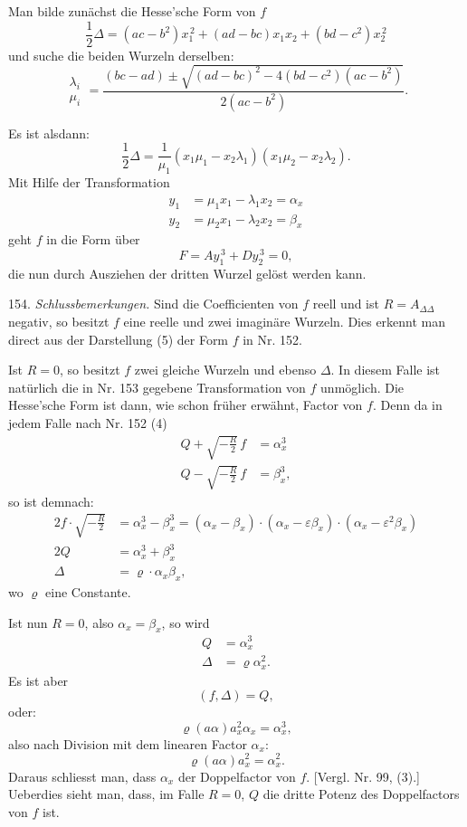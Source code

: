 \documentclass[11pt]{article}
\providecommand{\weberpage}[1]{}
\let\Delta\varDelta
\begin{document}
Man bilde zunächst die Hesse'sche Form von $f$
\[
\frac{1}{2}\Delta=(ac-b^2)x_1^{\,2}+(ad-bc)x_1x_2+(bd-c^2)x_2^{\,2}
\]
und suche die beiden Wurzeln derselben:
\[
\begin{matrix}\lambda_i\\ \mu_i\end{matrix}
=\frac{(bc-ad)\pm\sqrt{(ad-bc)^2-4(bd-c^2)(ac-b^2)}}{2(ac-b^2)}.
\]

Es ist alsdann:
\[
\frac{1}{2}\Delta=\frac{1}{\mu_1}(x_1\mu_1-x_2\lambda_1)(x_1\mu_2-x_2\lambda_2).
\]
Mit Hilfe der Transformation
\[
\begin{aligned}
y_1&=\mu_1x_1-\lambda_1x_2=\alpha_x\\
y_2&=\mu_2x_1-\lambda_2x_2=\beta_x
\end{aligned}
\]
geht $f$ in die Form über
\[
F=Ay_1^{\,3}+Dy_2^{\,3}=0,
\]
die nun durch Ausziehen der dritten Wurzel gelöst werden kann.

154. \textit{Schlussbemerkungen.} Sind die Coefficienten von $f$ reell und ist $R=A_{\Delta\Delta}$ negativ, so besitzt $f$ eine reelle und zwei imaginäre Wurzeln. Dies erkennt man direct aus der Darstellung (5) der Form $f$ in Nr. 152.


\weberpage{178}

Ist $R=0$, so besitzt $f$ zwei gleiche Wurzeln und ebenso $\Delta$. In diesem Falle ist natürlich die in Nr. 153 gegebene Transformation von $f$ unmöglich. %
Die Hesse'sche Form ist dann, wie schon früher erwähnt, Factor von $f$. Denn da in jedem Falle nach Nr. 152 (4)
\[
\begin{aligned}
Q+\sqrt{-\frac{R}{2}}\,f&=\alpha_x^3\\
Q-\sqrt{-\frac{R}{2}}\,f&=\beta_x^3,
\end{aligned}
\]
so ist demnach:
\[
\begin{aligned}
2f\cdot\sqrt{-\frac{R}{2}}&=\alpha_x^3-\beta_x^3=(\alpha_x-\beta_x)\cdot(\alpha_x-\varepsilon\beta_x)\cdot(\alpha_x-\varepsilon^2\beta_x)\\
2Q&=\alpha_x^3+\beta_x^3\\
\Delta&=\varrho\cdot\alpha_x\beta_x,
\end{aligned}
\]
wo $\varrho$ eine Constante.

Ist nun $R=0$, also $\alpha_x=\beta_x$, so wird
\[
\begin{aligned}
Q&=\alpha_x^3\\
\Delta&=\varrho\alpha_x^2.
\end{aligned}
\]
Es ist aber
\[
(f,\Delta)=Q,
\]
oder:
\[
\varrho(a\alpha)a_x^2\alpha_x=\alpha_x^3,
\]
also nach Division mit dem linearen Factor $\alpha_x$:
\[
\varrho(a\alpha)a_x^2=\alpha_x^2.
\]
Daraus schliesst man, dass $\alpha_x$ der Doppelfactor von $f$. [Vergl. Nr. 99, (3).] Ueberdies sieht man, dass, im Falle $R=0$, $Q$ die dritte Potenz des Doppelfactors von $f$ ist.
\end{document}
